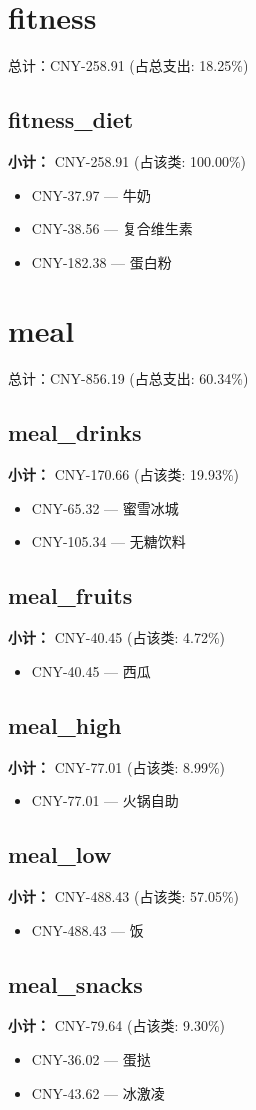 \documentclass[12pt]{article}
\begin{document}
\section*{fitness}
总计：CNY-258.91 	 (占总支出: 18.25\%)

\subsection*{fitness\_diet}
\textbf{小计：} CNY-258.91 (占该类: 100.00\%)
\begin{itemize}
    \item CNY-37.97 --- 牛奶
    \item CNY-38.56 --- 复合维生素
    \item CNY-182.38 --- 蛋白粉
\end{itemize}
\section*{meal}
总计：CNY-856.19 	 (占总支出: 60.34\%)

\subsection*{meal\_drinks}
\textbf{小计：} CNY-170.66 (占该类: 19.93\%)
\begin{itemize}
    \item CNY-65.32 --- 蜜雪冰城
    \item CNY-105.34 --- 无糖饮料
\end{itemize}
\subsection*{meal\_fruits}
\textbf{小计：} CNY-40.45 (占该类: 4.72\%)
\begin{itemize}
    \item CNY-40.45 --- 西瓜
\end{itemize}
\subsection*{meal\_high}
\textbf{小计：} CNY-77.01 (占该类: 8.99\%)
\begin{itemize}
    \item CNY-77.01 --- 火锅自助
\end{itemize}
\subsection*{meal\_low}
\textbf{小计：} CNY-488.43 (占该类: 57.05\%)
\begin{itemize}
    \item CNY-488.43 --- 饭
\end{itemize}
\subsection*{meal\_snacks}
\textbf{小计：} CNY-79.64 (占该类: 9.30\%)
\begin{itemize}
    \item CNY-36.02 --- 蛋挞
    \item CNY-43.62 --- 冰激凌
\end{itemize}
\end{document}
